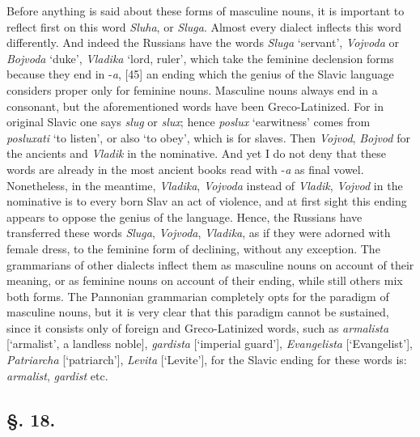 Before anything is said about these forms of masculine nouns, it is important to reflect first on this word \textit{Sluha}, or \textit{Sluga}. Almost every dialect inflects this word differently. And indeed the Russians have the words \textit{Sluga} ‘servant’, \textit{Vojvoda} or \textit{Bojvoda} ‘duke’, \textit{Vladika} ‘lord, ruler’, which take the feminine declension forms because they end in -\textit{a}, [45] an ending which the genius of the Slavic language considers proper only for feminine nouns. Masculine nouns always end in a consonant, but the aforementioned words have been Greco-Latinized. For in original Slavic one says \textit{slug} or \textit{slux}; hence \textit{poslux} ‘earwitness’ comes from \textit{posluxati} ‘to listen’, or also ‘to obey’, which is for slaves. Then \textit{Vojvod}, \textit{Bojvod} for the ancients and \textit{Vladik} in the nominative. And yet I do not deny that these words are already in the most ancient books read with -\textit{a} as final vowel. Nonetheless, in the meantime, \textit{Vladika}, \textit{Vojvoda} instead of \textit{Vladik}, \textit{Vojvod} in the nominative is to every born Slav an act of violence, and at first sight this ending appears to oppose the genius of the language. Hence, the Russians have transferred these words \textit{Sluga}, \textit{Vojvoda}, \textit{Vladika}, as if they were adorned with female dress, to the feminine form of declining, without any exception. The grammarians of other dialects inflect them as masculine nouns on account of their meaning, or as feminine nouns on account of their ending, while still others mix both forms. The Pannonian grammarian completely opts for the paradigm of masculine nouns, but it is very clear that this paradigm cannot be sustained, since it consists only of foreign and Greco-Latinized words, such as \textit{armalista} [‘armalist’, a landless noble], \textit{gardista} [‘imperial guard’], \textit{Evangelista} [‘Evangelist’], \textit{Patriarcha} [‘patriarch’], \textit{Levita} [‘Levite’], for the Slavic ending for these words is: \textit{armalist}, \textit{gardist} etc.

\subsection*{\hspace*{\fill}§. 18.\hspace*{\fill}}

